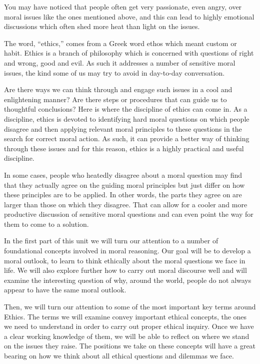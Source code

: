 \documentclass[
]{book}
\begin{document}
You may have noticed that people often get very passionate, even angry, over moral issues like the ones mentioned above, and this can lead to highly emotional discussions which often shed more heat than light on the issues.

The word, ``ethics,'' comes from a Greek word ethos which meant custom or habit. Ethics is a branch of philosophy which is concerned with questions of right and wrong, good and evil. As such it addresses a number of sensitive moral issues, the kind some of us may try to avoid in day-to-day conversation.

Are there ways we can think through and engage such issues in a cool and enlightening manner? Are there steps or procedures that can guide us to thoughtful conclusions? Here is where the discipline of ethics can come in. As a discipline, ethics is devoted to identifying hard moral questions on which people disagree and then applying relevant moral principles to these questions in the search for correct moral action. As such, it can provide a better way of thinking through these issues and for this reason, ethics is a highly practical and useful discipline.

In some cases, people who heatedly disagree about a moral question may find that they actually agree on the guiding moral principles but just differ on how these principles are to be applied. In other words, the parts they agree on are larger than those on which they disagree. That can allow for a cooler and more productive discussion of sensitive moral questions and can even point the way for them to come to a solution.

In the first part of this unit we will turn our attention to a number of foundational concepts involved in moral reasoning. Our goal will be to develop a moral outlook, to learn to think ethically about the moral questions we face in life. We will also explore further how to carry out moral discourse well and will examine the interesting question of why, around the world, people do not always appear to have the same moral outlook.

Then, we will turn our attention to some of the most important key terms around Ethics. The terms we will examine convey important ethical concepts, the ones we need to understand in order to carry out proper ethical inquiry. Once we have a clear working knowledge of them, we will be able to reflect on where we stand on the issues they raise. The positions we take on these concepts will have a great bearing on how we think about all ethical questions and dilemmas we face.
\end{document}
